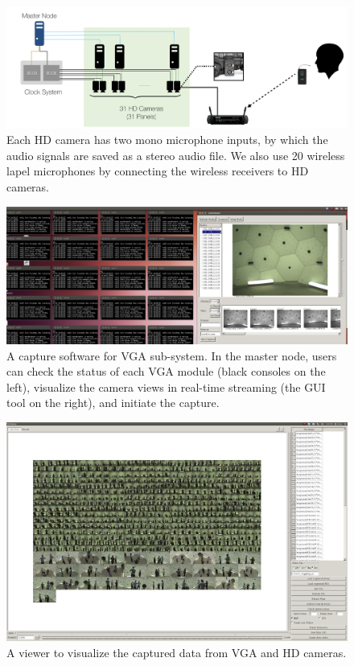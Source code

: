 \begin{figure}
	\includegraphics[width=\linewidth]{fig_system/dome_mic}
	\caption{Each HD camera has two mono microphone inputs, by which the audio signals are saved as a stereo audio file. We also use 20 wireless lapel microphones by connecting the wireless receivers to HD cameras.}
	\label{fig:dome_mic}
\end{figure}

\begin{figure}
	\includegraphics[width=\linewidth]{fig_system/dome_sw_capture.png}
	\caption{A capture software for VGA sub-system. In the master node, users can check the status of each VGA module (black consoles on the left), visualize the camera views in real-time streaming (the GUI tool on the right), and initiate the capture.}
	\label{fig:dome_vgaSW}
\end{figure}\vspace{0.5cm}
	
\begin{figure}[t]
	\includegraphics[width=\textwidth]{fig_system/dome_sw_viewer.png}
	\caption{A viewer to visualize the captured data from VGA and HD cameras.}
	\label{fig:dome_viewer}
\end{figure}

